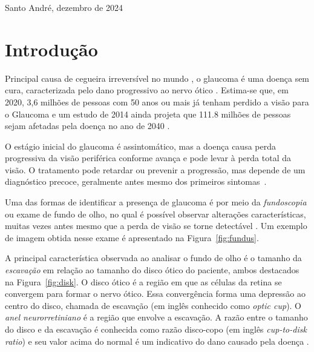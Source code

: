 \documentclass[12pt]{article}
\begin{document}
\begin{center}
Santo André, dezembro de 2024
\end{center}

\newpage
\bigskip

\section{Introdução}
\label{sec:introducao}

Principal causa de cegueira irreversível no mundo \cite{steinmetz_causes_2021}, o glaucoma é uma doença sem cura, caracterizada pelo dano progressivo ao nervo ótico \cite{who_2019}. Estima-se que, em 2020, 3,6 milhões de pessoas com 50 anos ou mais já tenham perdido a visão para o Glaucoma \cite{steinmetz_causes_2021} e um estudo de 2014 ainda projeta que 111.8 milhões de pessoas sejam afetadas pela doença no ano de 2040 \cite{tham_global_2014}.

O estágio inicial do glaucoma é assintomático, mas a doença causa perda progressiva da visão periférica conforme avança e pode levar à perda total da visão. O tratamento pode retardar ou prevenir a progressão, mas depende de um diagnóstico precoce, geralmente antes mesmo dos primeiros sintomas~\cite{who_2019}.

Uma das formas de identificar a presença de glaucoma é por meio da \emph{fundoscopia} ou exame de fundo de olho, no qual é possível observar alterações características, muitas vezes antes mesmo que a perda de visão se torne detectável \cite{weinreb_2004}. Um exemplo de imagem obtida nesse exame é apresentado na Figura~\ref{fig:fundus}.

A principal característica observada ao analisar o fundo de olho é o tamanho da \emph{escavação} em relação ao tamanho do disco ótico do paciente, ambos destacados na Figura~\ref{fig:disk}. O disco ótico é a região em que as células da retina se convergem para formar o nervo ótico. Essa convergência forma uma depressão ao centro do disco, chamada de escavação (em inglês conhecido como \emph{optic cup}). O \emph{anel neurorretiniano} é a região que envolve a escavação. A razão entre o tamanho do disco e da escavação é conhecida como razão disco-copo (em inglês \emph{cup-to-disk ratio}) e seu valor acima do normal é um indicativo do dano causado pela doença \cite{weinreb_2004}. %
\end{document}
